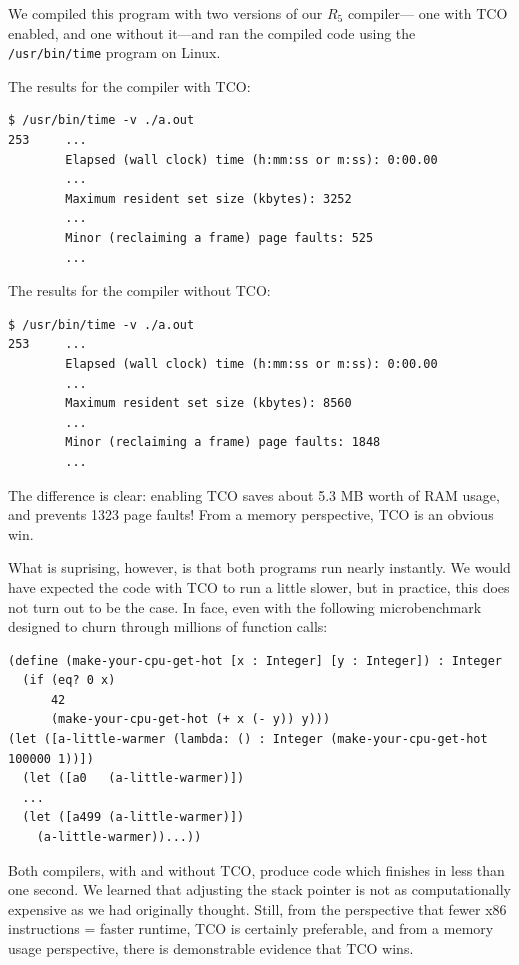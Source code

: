 \documentclass[12pt]{article}
\begin{document}
We compiled this program with two versions of our $R_5$ compiler---
one with TCO enabled, and one without it---and ran the compiled code
using the \verb+/usr/bin/time+ program on Linux.

The results for the compiler with TCO:

\begin{verbatim}
$ /usr/bin/time -v ./a.out 
253     ...
        Elapsed (wall clock) time (h:mm:ss or m:ss): 0:00.00
        ...
        Maximum resident set size (kbytes): 3252
        ...
        Minor (reclaiming a frame) page faults: 525
        ...
\end{verbatim}

The results for the compiler without TCO:

\begin{verbatim}
$ /usr/bin/time -v ./a.out 
253     ...
        Elapsed (wall clock) time (h:mm:ss or m:ss): 0:00.00
        ...
        Maximum resident set size (kbytes): 8560
        ...
        Minor (reclaiming a frame) page faults: 1848
        ...
\end{verbatim}

The difference is clear: enabling TCO saves about 5.3 MB worth of RAM usage, and
prevents 1323 page faults! From a memory perspective, TCO is an obvious win.

What is suprising, however, is that both programs run nearly instantly. We would
have expected the code with TCO to run a little slower, but in practice, this
does not turn out to be the case. In face, even with the following microbenchmark
designed to churn through millions of function calls:

\begin{verbatim}
(define (make-your-cpu-get-hot [x : Integer] [y : Integer]) : Integer
  (if (eq? 0 x)
      42
      (make-your-cpu-get-hot (+ x (- y)) y)))
(let ([a-little-warmer (lambda: () : Integer (make-your-cpu-get-hot 100000 1))])
  (let ([a0   (a-little-warmer)])
  ...
  (let ([a499 (a-little-warmer)])
    (a-little-warmer))...))
\end{verbatim}

Both compilers, with and without TCO, produce code which finishes in less than one
second. We learned that adjusting the stack pointer is not as computationally
expensive as we had originally thought. Still, from the perspective that fewer
x86 instructions = faster runtime, TCO is certainly preferable, and from a
memory usage perspective, there is demonstrable evidence that TCO wins.
\end{document}

